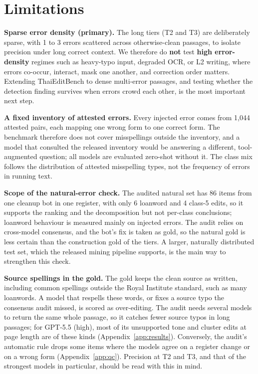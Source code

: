 \documentclass[11pt]{article}
\begin{document}
\section*{Limitations}
\textbf{Sparse error density (primary).} The long tiers (T2 and T3) are deliberately sparse,
with 1 to 3 errors scattered across otherwise-clean passages, to isolate precision under long
correct context. We therefore do \textbf{not} test \textbf{high error-density} regimes such as
heavy-typo input, degraded OCR, or L2 writing, where errors co-occur, interact, mask one
another, and correction order matters. Extending ThaiEditBench to dense multi-error passages,
and testing whether the detection finding survives when errors crowd each other, is the most
important next step.

\textbf{A fixed inventory of attested errors.} Every injected error comes from 1{,}044 attested
pairs, each mapping one wrong form to one correct form. The benchmark therefore does not cover
misspellings outside the inventory, and a model that consulted the released inventory would be
answering a different, tool-augmented question; all models are evaluated zero-shot without it.
The class mix follows the distribution of attested misspelling types, not the frequency of
errors in running text.

\textbf{Scope of the natural-error check.} The audited natural set has 86 items from one
cleanup bot in one register, with only 6 loanword and 4 class-5 edits, so it
supports the ranking and the decomposition but not per-class conclusions; loanword behaviour is
measured mainly on injected errors. The audit relies on cross-model consensus, and the bot's fix
is taken as gold, so the natural gold is less certain than the construction gold of the tiers.
A larger, naturally distributed test set, which the released mining pipeline supports, is the
main way to strengthen this check.

\textbf{Source spellings in the gold.} The gold keeps the clean source as written, including
common spellings outside the Royal Institute standard, such as many loanwords. A model that
respells these words, or fixes a source typo the consensus audit missed, is scored as
over-editing. The audit needs several models to return the same whole passage, so it catches
fewer source typos in long passages; for GPT-5.5 (high), most of its unsupported tone and
cluster edits at page length are of these kinds (Appendix~\ref{app:results}). Conversely, the audit's automatic rule
drops some items where the models agree on a register change or on a wrong form
(Appendix~\ref{app:qc}). Precision at T2 and T3, and that of the strongest models in particular,
should be read with this in mind.
\end{document}
